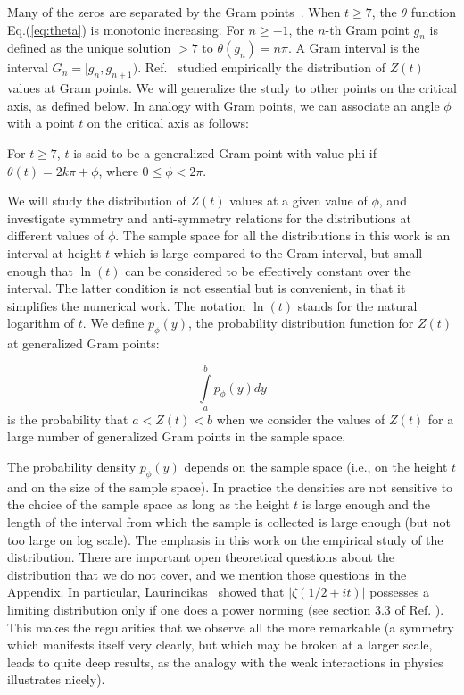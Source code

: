 \documentclass[twoside]{article}
\begin{document}
Many of the zeros are separated by the
Gram points~\cite{Gram 1903}.  When $t \ge 7$, the $\theta$ function Eq.(\ref{eq:theta}) is monotonic increasing. 
For $n \ge -1$, the $n$-th Gram point $g_n$ is defined as the unique solution $> 7$ to
$\theta (g_n) = n\pi$. A Gram interval is the interval $G_n = [g_n,g_{n+1})$.
Ref.~\cite{Shanker 2018} studied empirically the distribution of $Z(t)$ values at Gram points. We will generalize the study to other points on
the critical axis, as defined below. In analogy with Gram points, we can associate an angle $\phi$ with a point $t$ on the critical axis as follows:
\begin{definition}\label{phi}
For $t \ge 7$, $t$ is said to be a generalized Gram point with value phi if
$\theta (t) = 2k\pi + \phi$, where $0 \le \phi < 2\pi$.
\end{definition}
We will study the distribution of $Z(t)$ values at a given value of $\phi$, and investigate symmetry and anti-symmetry relations for the 
distributions at different values of $\phi$. The sample space for all the distributions in this work is an interval  at height $t$ which is large compared to the Gram interval, but small enough that $\ln (t)$ can be considered to be effectively constant over  the interval. 
The latter condition is not essential but is convenient, in that it simplifies the numerical work. The notation $\ln (t)$ stands for the natural logarithm of $t$.  We define $p_{\phi}(y)$, the probability distribution function for $Z(t)$ at generalized Gram  points:
\begin{definition}\label{pphi}
\begin{equation}
\int\limits_{a}^{b} p_{\phi}(y)dy
\label{eq:pdfphi}
\end{equation}
is the probability that $a<Z(t)<b$ when we consider the values of $Z(t)$ for a large number of generalized Gram points in the sample space. 
\end{definition}
The probability density  $p_{\phi}(y)$ depends on the sample space (i.e., on the height $t$ and on the size of the sample space). In practice the densities are not sensitive to the choice of the sample space as long as the height $t$ is large enough and the length of the interval from which the sample is collected is large enough (but not too large on log scale). The emphasis in this work on the empirical study of the distribution. There are important open theoretical questions about the distribution that we do not cover, and we mention those questions in the Appendix.
 In particular, Laurincikas~\cite{Laurincikas} showed  that $|\zeta(1/2+it)|$
 possesses a limiting distribution only if one does a power norming (see section 3.3 of Ref. \cite{Laurincikas}). This makes the regularities that we observe all the more remarkable (a symmetry which manifests
 itself very clearly, but which may be broken at a larger scale, leads to quite deep results, as the analogy with the weak interactions in physics 
 illustrates nicely).
\end{document}

